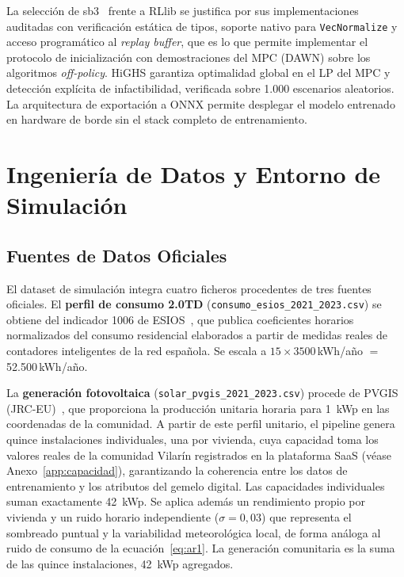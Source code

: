 \documentclass[12pt, a4paper, twoside]{report}
\begin{document}
La selección de \acrshort{sb3}~\citep{Raffin2021} frente a RLlib se justifica
por sus
implementaciones auditadas con verificación estática de tipos, soporte nativo
para \texttt{VecNormalize} y acceso programático al \textit{replay buffer},
que es lo que permite implementar el protocolo de inicialización con
demostraciones del MPC (DAWN) sobre los algoritmos \textit{off-policy}. HiGHS garantiza optimalidad global
en el LP del MPC y detección explícita de infactibilidad, verificada sobre 1.000
escenarios aleatorios. La arquitectura de exportación a ONNX permite desplegar
el modelo entrenado en hardware de borde sin el stack completo de entrenamiento.

\section{Ingeniería de Datos y Entorno de Simulación}
\label{sec:datos}

\subsection{Fuentes de Datos Oficiales}

El dataset de simulación integra cuatro ficheros procedentes de tres fuentes
oficiales. El \textbf{perfil de consumo 2.0TD} (\texttt{consumo\_esios\_2021\_2023.csv})
se obtiene del indicador 1006 de ESIOS~\citep{ESIOS}, que publica coeficientes
horarios normalizados del consumo residencial elaborados a partir de medidas
reales de contadores inteligentes de la red española. Se escala a
$15 \times 3500$\,kWh/año $=$ 52.500\,kWh/año.

La \textbf{generación fotovoltaica} (\texttt{solar\_pvgis\_2021\_2023.csv})
procede de PVGIS (JRC-EU)~\citep{PVGIS2022}, que proporciona la producción
unitaria horaria para
\SI{1}{kWp} en las coordenadas de la comunidad. A partir de este perfil unitario,
el pipeline genera quince instalaciones individuales, una por vivienda, cuya
capacidad toma los valores reales de la comunidad Vilarín registrados en la
plataforma SaaS (véase Anexo~\ref{app:capacidad}), garantizando la coherencia
entre los datos de entrenamiento y los atributos del gemelo digital. Las
capacidades individuales suman exactamente \SI{42}{kWp}. Se aplica además un
rendimiento propio por vivienda y un ruido horario independiente
($\sigma = 0{,}03$) que representa el sombreado puntual y la variabilidad
meteorológica local, de forma análoga al ruido de consumo de la
ecuación~\eqref{eq:ar1}. La generación comunitaria es la suma de las quince
instalaciones, \SI{42}{kWp} agregados.
\end{document}
